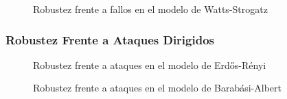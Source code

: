 \begin{figure}[h]
    \caption{Robustez frente a fallos en el modelo de Watts-Strogatz}
\end{figure}


\newpage
\subsubsection{Robustez Frente a Ataques Dirigidos}

\begin{figure}[h]
    \caption{Robustez frente a ataques en el modelo de Erdős-Rényi}
\end{figure}

\newpage
\begin{figure}[h]
    \caption{Robustez frente a ataques en el modelo de Barabási-Albert}
\end{figure}

